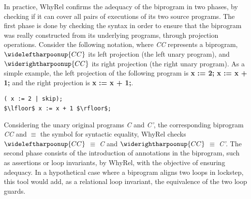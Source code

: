In practice, WhyRel confirms the adequacy of the biprogram in two phases, by checking if it can cover all pairs of executions of its two source programs.
The first phase is done by checking the syntax in order to ensure that the biprogram was really constructed from its underlying programs, through projection operations.
Consider the following notation, where \emph{CC} represents a biprogram, $\wideleftharpoonup{CC}$ its left projection (the left unary program), and $\widerightharpoonup{CC}$ its right projection (the right unary program).
As a simple example, the left projection of the following program is \textbf{x := 2; x := x + 1;} and the right projection is \textbf{x := x + 1;}.

\begin{lstlisting}[style=while_lang, mathescape,
                      emph={skip},
                      emphstyle=\ttfamily\bfseries\color{myorange}]
( x := 2 | skip);
$\lfloor$ x := x + 1 $\rfloor$;
\end{lstlisting}

Considering the unary original programs \emph{C} and \emph{C'}, the corresponding biprogram \emph{CC} and $\equiv$ the symbol for syntactic equality, WhyRel checks $\wideleftharpoonup{CC}$ $\equiv$ \emph{C} and $\widerightharpoonup{CC}$ $\equiv$ \emph{C'}.
The second phase consists of the introduction of annotations in the biprogram, such as assertions or loop invariants, by WhyRel, with the objective of ensuring adequacy.
In a hypothetical case where a biprogram aligns two loops in lockstep, this tool would add, as a relational loop invariant, the equivalence of the two loop guards.

